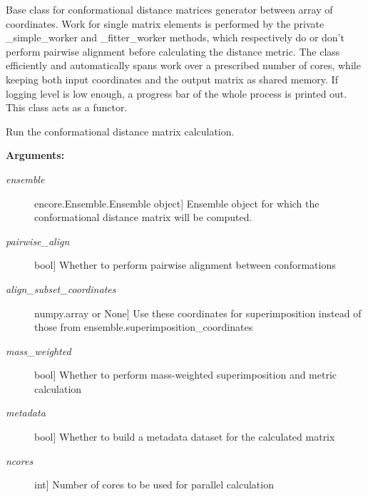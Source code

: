 \documentclass[letterpaper,10pt,english]{sphinxmanual}
\begin{document}
\begin{fulllineitems}
\label{index:encore.confdistmatrix.ConformationalDistanceMatrixGenerator}
Base class for conformational distance matrices generator between array of coordinates. Work for single matrix elements is performed by the private \_simple\_worker and \_fitter\_worker methods, which respectively do or don't perform pairwise alignment before calculating the distance metric. The class efficiently and automatically spans work over a prescribed number of cores, while keeping both input coordinates and the output matrix as shared memory. If logging level is low enough, a progress bar of the whole process is printed out. This class acts as a functor.

\begin{fulllineitems}
\label{index:encore.confdistmatrix.ConformationalDistanceMatrixGenerator.run}
Run the conformational distance matrix calculation.

\textbf{Arguments:}
\begin{description}
\item[{\emph{ensemble}}] \leavevmode{[}encore.Ensemble.Ensemble object{]}
Ensemble object for which the conformational distance matrix will be computed.

\item[{\emph{pairwise\_align}}] \leavevmode{[}bool{]}
Whether to perform pairwise alignment between conformations

\item[{\emph{align\_subset\_coordinates}}] \leavevmode{[}numpy.array or None{]}
Use these coordinates for superimposition instead of those from ensemble.superimposition\_coordinates

\item[{\emph{mass\_weighted}}] \leavevmode{[}bool{]}
Whether to perform mass-weighted superimposition and metric calculation

\item[{\emph{metadata}}] \leavevmode{[}bool{]}
Whether to build a metadata dataset for the calculated matrix

\item[{\emph{ncores}}] \leavevmode{[}int{]}
Number of cores to be used for parallel calculation


\end{description}
\end{fulllineitems}
\end{fulllineitems}
\end{document}
